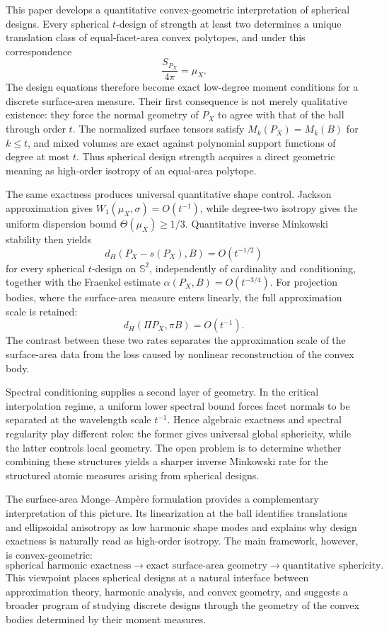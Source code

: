 \documentclass[11pt]{article}
\theoremstyle{definition}
\theoremstyle{remark}
\newcommand{\Sph}{\mathbb S}
\begin{document}
This paper develops a quantitative convex-geometric interpretation of spherical designs. Every spherical $t$-design of strength at least two determines a unique translation class of equal-facet-area convex polytopes, and under this correspondence
\[
\frac{S_{P_X}}{4\pi}=\mu_X.
\]
The design equations therefore become exact low-degree moment conditions for a discrete surface-area measure. Their first consequence is not merely qualitative existence: they force the normal geometry of $P_X$ to agree with that of the ball through order $t$. The normalized surface tensors satisfy $M_k(P_X)=M_k(B)$ for $k\le t$, and mixed volumes are exact against polynomial support functions of degree at most $t$. Thus spherical design strength acquires a direct geometric meaning as high-order isotropy of an equal-area polytope.

The same exactness produces universal quantitative shape control. Jackson approximation gives $W_1(\mu_X,\sigma)=O(t^{-1})$, while degree-two isotropy gives the uniform dispersion bound $\Theta(\mu_X)\ge1/3$. Quantitative inverse Minkowski stability then yields
\[
d_H(P_X-s(P_X),B)=O(t^{-1/2})
\]
for every spherical $t$-design on $\Sph^2$, independently of cardinality and conditioning, together with the Fraenkel estimate $\alpha(P_X,B)=O(t^{-3/4})$. For projection bodies, where the surface-area measure enters linearly, the full approximation scale is retained:
\[
d_H(\Pi P_X,\pi B)=O(t^{-1}).
\]
The contrast between these two rates separates the approximation scale of the surface-area data from the loss caused by nonlinear reconstruction of the convex body.

Spectral conditioning supplies a second layer of geometry. In the critical interpolation regime, a uniform lower spectral bound forces facet normals to be separated at the wavelength scale $t^{-1}$. Hence algebraic exactness and spectral regularity play different roles: the former gives universal global sphericity, while the latter controls local geometry. The open problem is to determine whether combining these structures yields a sharper inverse Minkowski rate for the structured atomic measures arising from spherical designs.

The surface-area Monge--Amp\`ere formulation provides a complementary interpretation of this picture. Its linearization at the ball identifies translations and ellipsoidal anisotropy as low harmonic shape modes and explains why design exactness is naturally read as high-order isotropy. The main framework, however, is convex-geometric:
\[
\boxed{
\text{spherical harmonic exactness}
\longrightarrow
\text{exact surface-area geometry}
\longrightarrow
\text{quantitative sphericity}.}
\]
This viewpoint places spherical designs at a natural interface between approximation theory, harmonic analysis, and convex geometry, and suggests a broader program of studying discrete designs through the geometry of the convex bodies determined by their moment measures.
\end{document}
